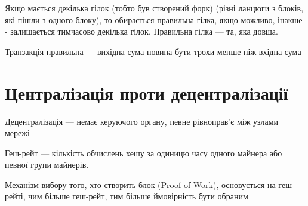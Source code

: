 \documentclass{article}
\begin{document}
    Якщо мається декілька гілок (тобто був створений форк) (різні ланцюги з блоків, які пішли з одного блоку), то обирається правильна гілка, якщо можливо, інакше - залишається тимчасово декілька гілок.
    Правильна гілка --- та, яка довша.

    Транзакція правильна --- вихідна сума повина бути трохи менше ніж вхідна сума

    \newpage
    \section{Централізація проти децентралізації}

    Децентралізація --- немає керуючого органу, певне рівноправ'є між узлами мережі

    Геш-рейт --- кількість обчислень хешу за одиницю часу одного майнера або певної групи майнерів.

    Механізм вибору того, хто створить блок (Proof of Work), основується на геш-рейті, чим більше геш-рейт, тим більше ймовірність бути обраним
\end{document}
